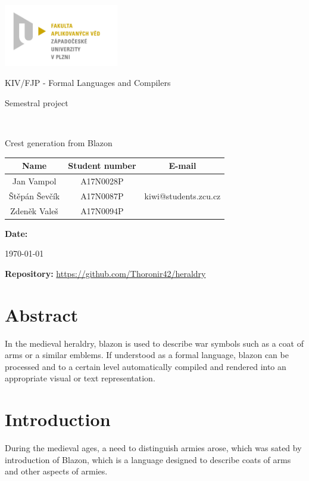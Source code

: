 \documentclass[12pt,a4paper]{article}
\author{Štěpán Ševčík}
\let\oldsection\section
\renewcommand\section{\clearpage\oldsection}
\begin{document}
\begin{titlepage}

\includegraphics[width=50mm]{img/FAV.jpg}
\\[160 pt]
\centerline{ \Huge \sc KIV/FJP - Formal Languages and Compilers}
\centerline{ \huge \sc Semestral project}
\\[12 pt]
{\large \sc
\centerline{Crest generation from Blazon}
}


{
\vfill 
\parindent=0cm

\begin{center}
\begin{tabular}{|c | c | c |}
	\hline
	\textbf{Name} & \textbf{Student number} & \textbf{E-mail} \\ \hline
	Jan Vampol & A17N0028P & \\ \hline
	Štěpán Ševčík &  A17N0087P & kiwi@students.zcu.cz \\ \hline
	Zdeněk Valeš & A17N0094P & \\ \hline
\end{tabular}
\end{center}
\textbf{Date:} {\large \today\par} %
\textbf{Repository:} \url{https://github.com/Thoronir42/heraldry}

}

\end{titlepage}




\section{Abstract}
In the medieval heraldry, blazon is used to describe war symbols such as a coat of arms or a similar emblems. If understood as a formal language, blazon can be processed and to a certain level automatically compiled and rendered into an appropriate visual or text representation.

\section{Introduction}
During the medieval ages, a need to distinguish armies arose, which was sated by introduction of Blazon, which is a language designed to describe coats of arms and other aspects of armies.
\end{document}
